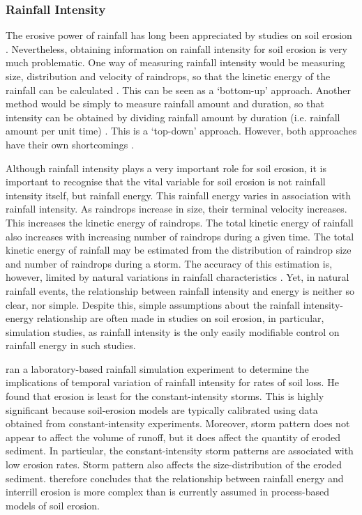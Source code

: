 \subsubsection{Rainfall Intensity} %
\label{sec:RainfallIntensity}

The erosive power of rainfall has long been appreciated by studies on soil
erosion \citep{musgrave1947-133,wischmeier1958-rainfall}. Nevertheless,
obtaining information on rainfall intensity for soil erosion is very much
problematic. One way of measuring rainfall intensity would be measuring size,
distribution and velocity of raindrops, so that the kinetic energy of the
rainfall can be calculated \citep{cerda1997-169,lascelles2000-709}. This can be
seen as a `bottom-up' approach. Another method would be simply to measure
rainfall amount and duration, so that intensity can be obtained by dividing
rainfall amount by duration (i.e. rainfall amount per unit time)
\citep{osborn1998-505}. This is a `top-down' approach. However, both approaches
have their own shortcomings
\citep{parsons2000-723,schuur2001-1019,garcia2001-675}.

Although rainfall intensity plays a very important role for soil erosion, it is
important to recognise that the vital variable for soil erosion is not rainfall
intensity itself, but rainfall energy. This rainfall energy varies in
association with rainfall intensity. As raindrops increase in size, their
terminal velocity increases. This increases the kinetic energy of raindrops. The
total kinetic energy of rainfall also increases with increasing number of
raindrops during a given time. The total kinetic energy of rainfall may be
estimated from the distribution of raindrop size and number of raindrops during
a storm. The accuracy of this estimation is, however, limited by natural
variations in rainfall characteristics \citep{vandijk2002-1}. Yet, in natural
rainfall events, the relationship between rainfall intensity and energy is
neither so clear, nor simple. Despite this, simple assumptions about the
rainfall intensity-energy relationship are often made in studies on soil
erosion, in particular, simulation studies, as rainfall intensity is the only
easily modifiable control on rainfall energy in such studies.

\citet{parsons2006-68} ran a laboratory-based rainfall simulation
experiment to determine the implications of temporal variation of rainfall
intensity for rates of soil loss. He found that erosion is least for the
constant-intensity storms. This is highly significant because soil-erosion
models are typically calibrated using data obtained from constant-intensity
experiments. Moreover, storm pattern does not appear to affect the volume of
runoff, but it does affect the quantity of eroded sediment. In particular, the
constant-intensity storm patterns are associated with low erosion rates. Storm
pattern also affects the size-distribution of the eroded sediment.
\citet{parsons2006-68} therefore concludes that the relationship between
rainfall energy and interrill erosion is more complex than is currently assumed
in process-based models of soil erosion.

